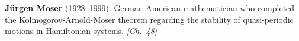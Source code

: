 \textbf{Jürgen Moser} (1928–1999). German-American mathematician who completed the Kolmogorov-Arnold-Moser theorem regarding the stability of quasi-periodic motions in Hamiltonian systems. \emph{[Ch.~\hyperref[ch:threebody]{48}]}

